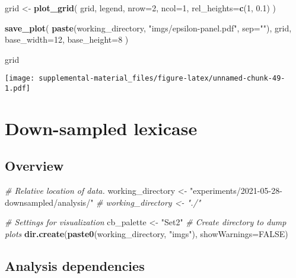 \documentclass[]{book}
\newenvironment{Shaded}{\begin{snugshade}}{\end{snugshade}}
\newcommand{\CommentTok}[1]{\textcolor[rgb]{0.56,0.35,0.01}{\textit{#1}}}
\newcommand{\DataTypeTok}[1]{\textcolor[rgb]{0.13,0.29,0.53}{#1}}
\newcommand{\DecValTok}[1]{\textcolor[rgb]{0.00,0.00,0.81}{#1}}
\newcommand{\FloatTok}[1]{\textcolor[rgb]{0.00,0.00,0.81}{#1}}
\newcommand{\KeywordTok}[1]{\textcolor[rgb]{0.13,0.29,0.53}{\textbf{#1}}}
\newcommand{\NormalTok}[1]{#1}
\newcommand{\OtherTok}[1]{\textcolor[rgb]{0.56,0.35,0.01}{#1}}
\newcommand{\StringTok}[1]{\textcolor[rgb]{0.31,0.60,0.02}{#1}}
\begin{document}
\begin{Shaded}
\begin{Highlighting}[]
\NormalTok{grid <-}\StringTok{ }\KeywordTok{plot_grid}\NormalTok{(}
\NormalTok{  grid,}
\NormalTok{  legend,}
  \DataTypeTok{nrow=}\DecValTok{2}\NormalTok{,}
  \DataTypeTok{ncol=}\DecValTok{1}\NormalTok{,}
  \DataTypeTok{rel_heights=}\KeywordTok{c}\NormalTok{(}\DecValTok{1}\NormalTok{, }\FloatTok{0.1}\NormalTok{)}
\NormalTok{)}

\KeywordTok{save_plot}\NormalTok{(}
  \KeywordTok{paste}\NormalTok{(working_directory, }\StringTok{"imgs/epsilon-panel.pdf"}\NormalTok{, }\DataTypeTok{sep=}\StringTok{""}\NormalTok{),}
\NormalTok{  grid,}
  \DataTypeTok{base_width=}\DecValTok{12}\NormalTok{,}
  \DataTypeTok{base_height=}\DecValTok{8}
\NormalTok{)}

\NormalTok{grid}
\end{Highlighting}
\end{Shaded}

\texttt{[image: supplemental-material\_files/figure-latex/unnamed-chunk-49-1.pdf]}

\hypertarget{down-sampled-lexicase}{%
\chapter{Down-sampled lexicase}\label{down-sampled-lexicase}}

\hypertarget{overview-4}{%
\section{Overview}\label{overview-4}}

\begin{Shaded}
\begin{Highlighting}[]
\CommentTok{# Relative location of data.}
\NormalTok{working_directory <-}\StringTok{ "experiments/2021-05-28-downsampled/analysis/"}
\CommentTok{# working_directory <- "./"}

\CommentTok{# Settings for visualization}
\NormalTok{cb_palette <-}\StringTok{ "Set2"}
\CommentTok{# Create directory to dump plots}
\KeywordTok{dir.create}\NormalTok{(}\KeywordTok{paste0}\NormalTok{(working_directory, }\StringTok{"imgs"}\NormalTok{), }\DataTypeTok{showWarnings=}\OtherTok{FALSE}\NormalTok{)}
\end{Highlighting}
\end{Shaded}

\hypertarget{analysis-dependencies-4}{%
\section{Analysis dependencies}\label{analysis-dependencies-4}}
\end{document}
